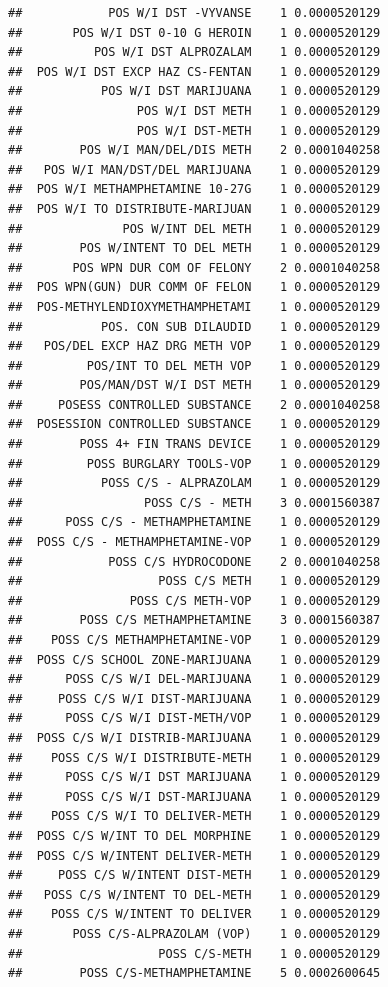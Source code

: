 \documentclass[]{book}
\begin{document}
\begin{verbatim}
##            POS W/I DST -VYVANSE    1 0.0000520129
##       POS W/I DST 0-10 G HEROIN    1 0.0000520129
##          POS W/I DST ALPROZALAM    1 0.0000520129
##  POS W/I DST EXCP HAZ CS-FENTAN    1 0.0000520129
##           POS W/I DST MARIJUANA    1 0.0000520129
##                POS W/I DST METH    1 0.0000520129
##                POS W/I DST-METH    1 0.0000520129
##        POS W/I MAN/DEL/DIS METH    2 0.0001040258
##   POS W/I MAN/DST/DEL MARIJUANA    1 0.0000520129
##  POS W/I METHAMPHETAMINE 10-27G    1 0.0000520129
##  POS W/I TO DISTRIBUTE-MARIJUAN    1 0.0000520129
##              POS W/INT DEL METH    1 0.0000520129
##        POS W/INTENT TO DEL METH    1 0.0000520129
##       POS WPN DUR COM OF FELONY    2 0.0001040258
##  POS WPN(GUN) DUR COMM OF FELON    1 0.0000520129
##  POS-METHYLENDIOXYMETHAMPHETAMI    1 0.0000520129
##           POS. CON SUB DILAUDID    1 0.0000520129
##   POS/DEL EXCP HAZ DRG METH VOP    1 0.0000520129
##         POS/INT TO DEL METH VOP    1 0.0000520129
##        POS/MAN/DST W/I DST METH    1 0.0000520129
##     POSESS CONTROLLED SUBSTANCE    2 0.0001040258
##  POSESSION CONTROLLED SUBSTANCE    1 0.0000520129
##        POSS 4+ FIN TRANS DEVICE    1 0.0000520129
##         POSS BURGLARY TOOLS-VOP    1 0.0000520129
##           POSS C/S - ALPRAZOLAM    1 0.0000520129
##                 POSS C/S - METH    3 0.0001560387
##      POSS C/S - METHAMPHETAMINE    1 0.0000520129
##  POSS C/S - METHAMPHETAMINE-VOP    1 0.0000520129
##            POSS C/S HYDROCODONE    2 0.0001040258
##                   POSS C/S METH    1 0.0000520129
##               POSS C/S METH-VOP    1 0.0000520129
##        POSS C/S METHAMPHETAMINE    3 0.0001560387
##    POSS C/S METHAMPHETAMINE-VOP    1 0.0000520129
##  POSS C/S SCHOOL ZONE-MARIJUANA    1 0.0000520129
##      POSS C/S W/I DEL-MARIJUANA    1 0.0000520129
##     POSS C/S W/I DIST-MARIJUANA    1 0.0000520129
##      POSS C/S W/I DIST-METH/VOP    1 0.0000520129
##  POSS C/S W/I DISTRIB-MARIJUANA    1 0.0000520129
##    POSS C/S W/I DISTRIBUTE-METH    1 0.0000520129
##      POSS C/S W/I DST MARIJUANA    1 0.0000520129
##      POSS C/S W/I DST-MARIJUANA    1 0.0000520129
##    POSS C/S W/I TO DELIVER-METH    1 0.0000520129
##  POSS C/S W/INT TO DEL MORPHINE    1 0.0000520129
##  POSS C/S W/INTENT DELIVER-METH    1 0.0000520129
##     POSS C/S W/INTENT DIST-METH    1 0.0000520129
##   POSS C/S W/INTENT TO DEL-METH    1 0.0000520129
##    POSS C/S W/INTENT TO DELIVER    1 0.0000520129
##       POSS C/S-ALPRAZOLAM (VOP)    1 0.0000520129
##                   POSS C/S-METH    1 0.0000520129
##        POSS C/S-METHAMPHETAMINE    5 0.0002600645

\end{verbatim}
\end{document}
